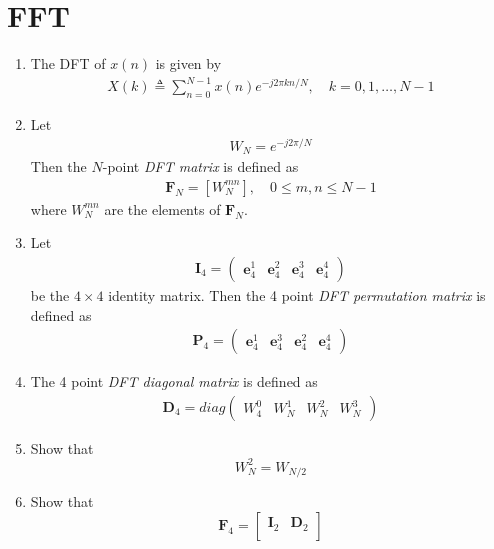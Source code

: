 \documentclass[journal,12pt,twocolumn]{IEEEtran}
\providecommand{\sbrak}[1]{\ensuremath{\left[#1\right]}}
\let\vec\mathbf
\numberwithin{equation}{section}
\renewcommand\thesection{\arabic{section}}
\newcommand{\myvec}[1]{\ensuremath{\begin{pmatrix}#1\end{pmatrix}}}
\begin{document}
\section{FFT}
\begin{enumerate}[label=\arabic*.,ref=\thesection.\theenumi]
    \item The DFT of $x(n)$ is given by
    \begin{align}
        X(k) \triangleq \sum_{n=0}^{N-1} x(n) e^{-j 2 \pi k n / N}, \quad k=0,1, \ldots, N-1
    \end{align}
\item Let 
	\begin{align}
W_{N} = e^{-j2\pi/N} 
	\end{align}
		Then the $N$-point {\em DFT matrix} is defined as 
	\begin{align}
		\vec{F}_{N} = \sbrak{W_{N}^{mn}}, \quad 0 \le m,n \le N-1 
	\end{align}
	where $W_{N}^{mn}$ are the elements of $\vec{F}_{N}$.
\item Let 
	\begin{align}
		\vec{I}_4 = \myvec{\vec{e}_4^{1} &\vec{e}_4^{2} &\vec{e}_4^{3} &\vec{e}_4^{4} }
	\end{align}
		be the $4\times 4$ identity matrix.  Then the 4 point {\em DFT permutation matrix} is defined as 
	\begin{align}
		\vec{P}_4 = \myvec{\vec{e}_4^{1} &\vec{e}_4^{3} &\vec{e}_4^{2} &\vec{e}_4^{4} }
	\end{align}
\item The 4 point {\em DFT diagonal matrix} is defined as 
	\begin{align}
		\vec{D}_4 = diag\myvec{W_{4}^{0} & W_{N}^{1} & W_{N}^{2} & W_{N}^{3}}
	\end{align}
\item Show that 
\begin{equation}
    W_{N}^{2}=W_{N/2}
\end{equation}
    \item Show that 
\begin{equation}
	\vec{F}_{4}=
\begin{bmatrix}
	\vec{I}_{2} & \vec{D}_{2} \\

\end{bmatrix}
\end{equation}
\end{enumerate}
\end{document}
